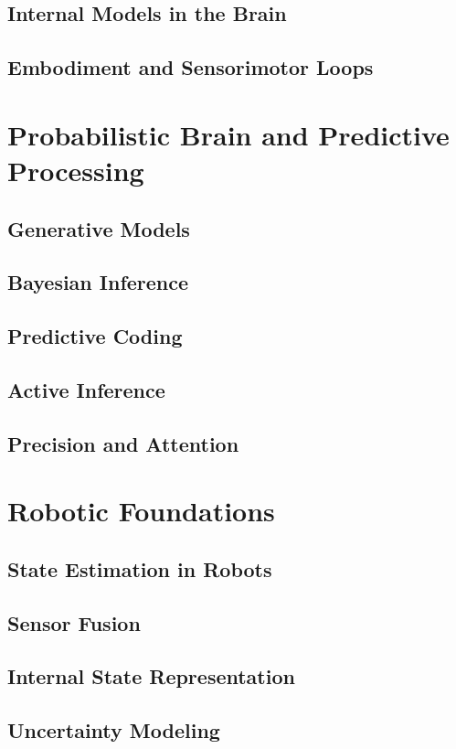 \documentclass[a4paper]{article}
\begin{document}
	\subsection{Internal Models in the Brain}
	\subsection{Embodiment and Sensorimotor Loops}

\section{Probabilistic Brain and Predictive Processing}

	\subsection{Generative Models}
	\subsection{Bayesian Inference}
	\subsection{Predictive Coding}
	\subsection{Active Inference}
	\subsection{Precision and Attention}

\section{Robotic Foundations}

	\subsection{State Estimation in Robots}
	\subsection{Sensor Fusion}
	\subsection{Internal State Representation}
	\subsection{Uncertainty Modeling}
\end{document}
